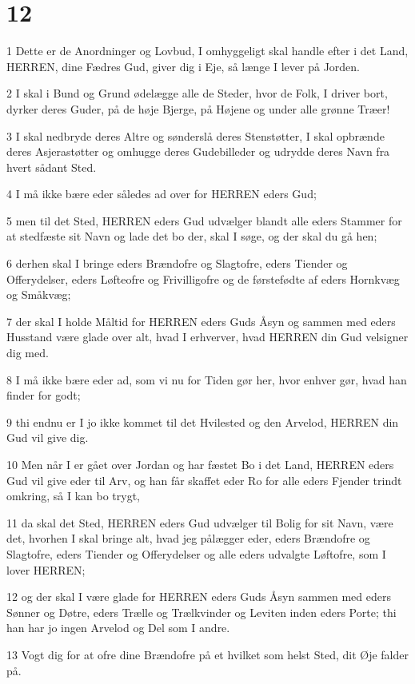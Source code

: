 \chapter{12}

\par 1 Dette er de Anordninger og Lovbud, I omhyggeligt skal handle efter i det Land, HERREN, dine Fædres Gud, giver dig i Eje, så længe I lever på Jorden.
\par 2 I skal i Bund og Grund ødelægge alle de Steder, hvor de Folk, I driver bort, dyrker deres Guder, på de høje Bjerge, på Højene og under alle grønne Træer!
\par 3 I skal nedbryde deres Altre og sønderslå deres Stenstøtter, I skal opbrænde deres Asjerastøtter og omhugge deres Gudebilleder og udrydde deres Navn fra hvert sådant Sted.
\par 4 I må ikke bære eder således ad over for HERREN eders Gud;
\par 5 men til det Sted, HERREN eders Gud udvælger blandt alle eders Stammer for at stedfæste sit Navn og lade det bo der, skal I søge, og der skal du gå hen;
\par 6 derhen skal I bringe eders Brændofre og Slagtofre, eders Tiender og Offerydelser, eders Løfteofre og Frivilligofre og de førstefødte af eders Hornkvæg og Småkvæg;
\par 7 der skal I holde Måltid for HERREN eders Guds Åsyn og sammen med eders Husstand være glade over alt, hvad I erhverver, hvad HERREN din Gud velsigner dig med.
\par 8 I må ikke bære eder ad, som vi nu for Tiden gør her, hvor enhver gør, hvad han finder for godt;
\par 9 thi endnu er I jo ikke kommet til det Hvilested og den Arvelod, HERREN din Gud vil give dig.
\par 10 Men når I er gået over Jordan og har fæstet Bo i det Land, HERREN eders Gud vil give eder til Arv, og han får skaffet eder Ro for alle eders Fjender trindt omkring, så I kan bo trygt,
\par 11 da skal det Sted, HERREN eders Gud udvælger til Bolig for sit Navn, være det, hvorhen I skal bringe alt, hvad jeg pålægger eder, eders Brændofre og Slagtofre, eders Tiender og Offerydelser og alle eders udvalgte Løftofre, som I lover HERREN;
\par 12 og der skal I være glade for HERREN eders Guds Åsyn sammen med eders Sønner og Døtre, eders Trælle og Trælkvinder og Leviten inden eders Porte; thi han har jo ingen Arvelod og Del som I andre.
\par 13 Vogt dig for at ofre dine Brændofre på et hvilket som helst Sted, dit Øje falder på.
